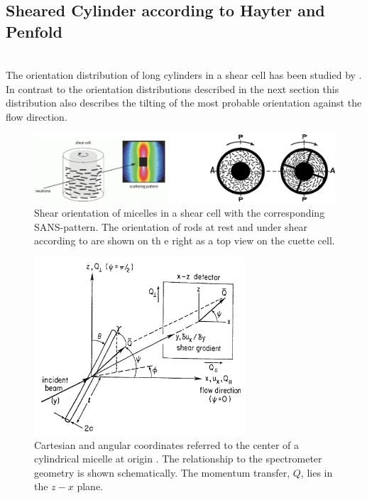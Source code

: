 \subsection{Sheared Cylinder according to Hayter and Penfold}
\label{sect:ShearedCylinderHayterPenfold}
\hspace{1pt}\\
The orientation distribution of long cylinders in a shear cell has been studied by \cite{Scheraga1951,Jerrard1959,Hayter1984}. In contrast to the orientation distributions described in the next section this distribution also describes the tilting of the most probable orientation against the flow direction.
\begin{figure}[htb]
\begin{center}
\includegraphics[width=\textwidth]{sheared_cylinders_n_phi0.png}
\end{center}
\caption{Shear orientation of micelles in a shear cell with the
corresponding SANS-pattern. The orientation of rods at rest and under shear according to \cite{Scheraga1951} are shown on th e right as a top view on the cuette cell.} \label{sheared_cylinders1}
\end{figure}

\begin{figure}[htb]
\begin{center}
\includegraphics[width=0.7\textwidth]{shear_cuette_SANS_geometry.png}
\end{center}
\caption{Cartesian and angular coordinates referred to the center
of a cylindrical micelle at origin \cite{Hayter1984}. The relationship to the
spectrometer geometry is shown schematically. The momentum
transfer, $Q$, lies in the $z-x$ plane.}
\label{shear_cuette_SANS_geometry}
\end{figure}

